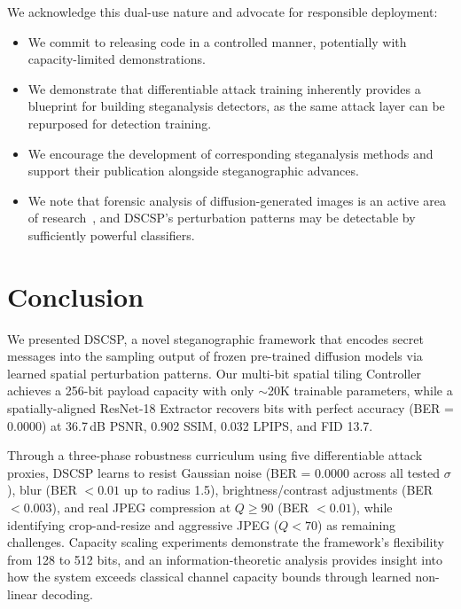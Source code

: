 \documentclass[10pt, twocolumn]{article}
\begin{document}
We acknowledge this dual-use nature and advocate for responsible deployment:
\begin{itemize}[itemsep=1pt, topsep=2pt]
    \item We commit to releasing code in a controlled manner, potentially with capacity-limited demonstrations.
    \item We demonstrate that differentiable attack training inherently provides a blueprint for building steganalysis detectors, as the same attack layer can be repurposed for detection training.
    \item We encourage the development of corresponding steganalysis methods and support their publication alongside steganographic advances.
    \item We note that forensic analysis of diffusion-generated images is an active area of research~\cite{corvi2023detection}, and DSCSP's perturbation patterns may be detectable by sufficiently powerful classifiers.
\end{itemize}


\section{Conclusion}
\label{sec:conclusion}

We presented DSCSP, a novel steganographic framework that encodes secret messages into the sampling output of frozen pre-trained diffusion models via learned spatial perturbation patterns.
Our multi-bit spatial tiling Controller achieves a 256-bit payload capacity with only $\sim$20K trainable parameters, while a spatially-aligned ResNet-18 Extractor recovers bits with perfect accuracy (BER = 0.0000) at 36.7\,dB PSNR, 0.902 SSIM, 0.032 LPIPS, and FID 13.7.

Through a three-phase robustness curriculum using five differentiable attack proxies, DSCSP learns to resist Gaussian noise (BER = 0.0000 across all tested $\sigma$), blur (BER $< 0.01$ up to radius 1.5), brightness/contrast adjustments (BER $< 0.003$), and real JPEG compression at $Q \geq 90$ (BER $< 0.01$), while identifying crop-and-resize and aggressive JPEG ($Q < 70$) as remaining challenges.
Capacity scaling experiments demonstrate the framework's flexibility from 128 to 512 bits, and an information-theoretic analysis provides insight into how the system exceeds classical channel capacity bounds through learned non-linear decoding.
\end{document}

